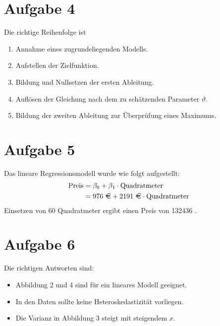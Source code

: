 \documentclass{article}
\begin{document}
	\section*{Aufgabe 4}
	Die richtige Reihenfolge ist
	\begin{enumerate}[label=\arabic*.]
		\item Annahme eines zugrundeliegenden Modells.
		\item Aufstellen der Zielfunktion.
		\item Bildung und Nullsetzen der ersten Ableitung.
		\item Auflösen der Gleichung nach dem zu schätzenden Parameter $\vartheta$.
		\item Bildung der zweiten Ableitung zur Überprüfung eines Maximums.
	\end{enumerate}

	\section*{Aufgabe 5}
	Das lineare Regressionsmodell wurde wie folgt aufgestellt:
	\begin{align}
		\text{Preis} &= \beta_0 + \beta_1\cdot\text{Quadratmeter} \notag \\
		&= 976\text{ \EUR} + 2191\text{ \EUR}\cdot\text{Quadratmeter} \notag
	\end{align}
	Einsetzen von 60 Quadratmeter ergibt einen Preis von 132436 \EUR.
	
	\section*{Aufgabe 6}
	Die richtigen Antworten sind:
	\begin{itemize}
		\item Abbildung 2 und 4 sind für ein lineares Modell geeignet.
		\item In den Daten sollte keine Heteroskedastizität vorliegen.
		\item Die Varianz in Abbildung 3 steigt mit steigendem $x$.
	\end{itemize}
	
\end{document}
